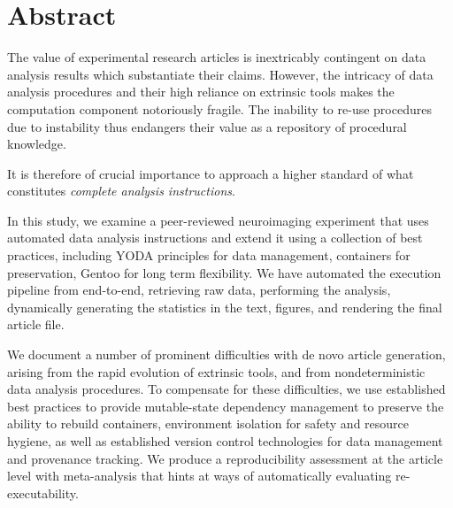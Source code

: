 \section{Abstract}

The value of experimental research articles is inextricably contingent on data analysis results which substantiate their claims.
However, the intricacy of data analysis procedures and their high reliance on extrinsic tools makes the computation component notoriously fragile.
The inability to re-use procedures due to instability thus endangers their value as a repository of procedural knowledge.

It is therefore of crucial importance to approach a higher standard of what constitutes \textit{complete analysis instructions}.

In this study, we examine a peer-reviewed neuroimaging experiment that uses automated data analysis instructions and extend it using a collection of best practices, including YODA principles for data management, containers for preservation, Gentoo for long term flexibility.
We have automated the execution pipeline from end-to-end, retrieving raw data, performing the analysis, dynamically generating the statistics in the text, figures, and rendering the final article file.

We document a number of prominent difficulties with de novo article generation, arising from the rapid evolution of extrinsic tools, and from nondeterministic data analysis procedures.
To compensate for these difficulties, we use established best practices to provide mutable-state dependency management to preserve the ability to rebuild containers, environment isolation for safety and resource hygiene, as well as established version control technologies for data management and provenance tracking.
We produce a reproducibility assessment at the article level with meta-analysis that hints at ways of automatically evaluating re-executability.

